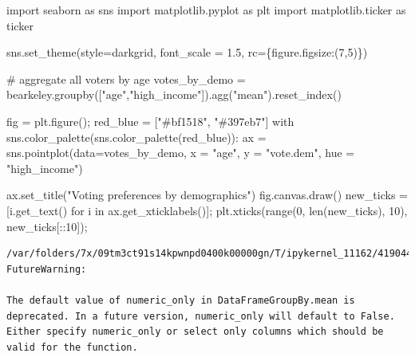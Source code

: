 \documentclass[
  letterpaper,
  DIV=11,
  numbers=noendperiod]{scrreprt}
\newenvironment{Shaded}{\begin{snugshade}}{\end{snugshade}}
\newcommand{\BuiltInTok}[1]{\textcolor[rgb]{0.00,0.23,0.31}{#1}}
\newcommand{\CommentTok}[1]{\textcolor[rgb]{0.37,0.37,0.37}{#1}}
\newcommand{\ControlFlowTok}[1]{\textcolor[rgb]{0.00,0.23,0.31}{#1}}
\newcommand{\DecValTok}[1]{\textcolor[rgb]{0.68,0.00,0.00}{#1}}
\newcommand{\FloatTok}[1]{\textcolor[rgb]{0.68,0.00,0.00}{#1}}
\newcommand{\ImportTok}[1]{\textcolor[rgb]{0.00,0.46,0.62}{#1}}
\newcommand{\KeywordTok}[1]{\textcolor[rgb]{0.00,0.23,0.31}{#1}}
\newcommand{\NormalTok}[1]{\textcolor[rgb]{0.00,0.23,0.31}{#1}}
\newcommand{\OperatorTok}[1]{\textcolor[rgb]{0.37,0.37,0.37}{#1}}
\newcommand{\StringTok}[1]{\textcolor[rgb]{0.13,0.47,0.30}{#1}}
\begin{document}
\begin{Shaded}
\begin{Highlighting}[]
\ImportTok{import}\NormalTok{ seaborn }\ImportTok{as}\NormalTok{ sns}
\ImportTok{import}\NormalTok{ matplotlib.pyplot }\ImportTok{as}\NormalTok{ plt}
\ImportTok{import}\NormalTok{ matplotlib.ticker }\ImportTok{as}\NormalTok{ ticker}

\NormalTok{sns.set\_theme(style}\OperatorTok{=}\StringTok{\textquotesingle{}darkgrid\textquotesingle{}}\NormalTok{, font\_scale }\OperatorTok{=} \FloatTok{1.5}\NormalTok{,}
\NormalTok{              rc}\OperatorTok{=}\NormalTok{\{}\StringTok{\textquotesingle{}figure.figsize\textquotesingle{}}\NormalTok{:(}\DecValTok{7}\NormalTok{,}\DecValTok{5}\NormalTok{)\})}

\CommentTok{\# aggregate all voters by age}
\NormalTok{votes\_by\_demo }\OperatorTok{=}\NormalTok{ bearkeley.groupby([}\StringTok{"age"}\NormalTok{,}\StringTok{"high\_income"}\NormalTok{]).agg(}\StringTok{"mean"}\NormalTok{).reset\_index()}

\NormalTok{fig }\OperatorTok{=}\NormalTok{ plt.figure()}\OperatorTok{;}
\NormalTok{red\_blue }\OperatorTok{=}\NormalTok{ [}\StringTok{"\#bf1518"}\NormalTok{, }\StringTok{"\#397eb7"}\NormalTok{]}
\ControlFlowTok{with}\NormalTok{ sns.color\_palette(sns.color\_palette(red\_blue)):}
\NormalTok{    ax }\OperatorTok{=}\NormalTok{ sns.pointplot(data}\OperatorTok{=}\NormalTok{votes\_by\_demo, x }\OperatorTok{=} \StringTok{"age"}\NormalTok{, y }\OperatorTok{=} \StringTok{"vote.dem"}\NormalTok{, hue }\OperatorTok{=} \StringTok{"high\_income"}\NormalTok{)}

\NormalTok{ax.set\_title(}\StringTok{"Voting preferences by demographics"}\NormalTok{)}
\NormalTok{fig.canvas.draw()}
\NormalTok{new\_ticks }\OperatorTok{=}\NormalTok{ [i.get\_text() }\ControlFlowTok{for}\NormalTok{ i }\KeywordTok{in}\NormalTok{ ax.get\_xticklabels()]}\OperatorTok{;}
\NormalTok{plt.xticks(}\BuiltInTok{range}\NormalTok{(}\DecValTok{0}\NormalTok{, }\BuiltInTok{len}\NormalTok{(new\_ticks), }\DecValTok{10}\NormalTok{), new\_ticks[::}\DecValTok{10}\NormalTok{])}\OperatorTok{;}
\end{Highlighting}
\end{Shaded}

\begin{verbatim}
/var/folders/7x/09tm3ct91s14kpwnpd0400k00000gn/T/ipykernel_11162/4190445166.py:9: FutureWarning:

The default value of numeric_only in DataFrameGroupBy.mean is deprecated. In a future version, numeric_only will default to False. Either specify numeric_only or select only columns which should be valid for the function.
\end{verbatim}
\end{document}
